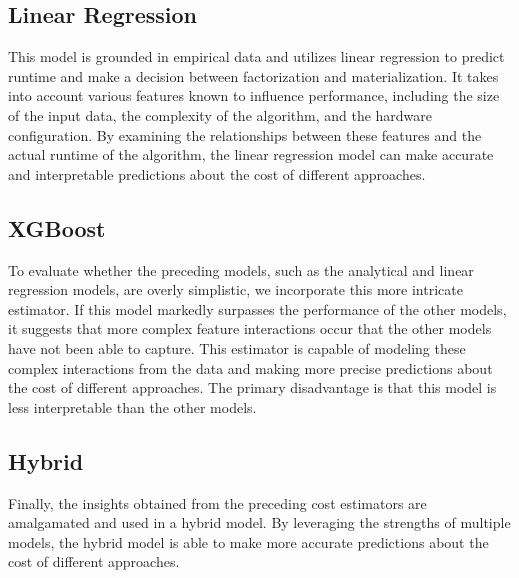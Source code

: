 \subsection{Linear Regression}
This model is grounded in empirical data and utilizes linear regression to predict runtime and make a decision between factorization and materialization. It takes into account various features known to influence performance, including the size of the input data, the complexity of the algorithm, and the hardware configuration. By examining the relationships between these features and the actual runtime of the algorithm, the linear regression model can make accurate and interpretable predictions about the cost of different approaches.

\subsection{XGBoost}
To evaluate whether the preceding models, such as the analytical and linear regression models, are overly simplistic, we incorporate this more intricate estimator. If this model markedly surpasses the performance of the other models, it suggests that more complex feature interactions occur that the other models have not been able to capture. This estimator is capable of modeling these complex interactions from the data and making more precise predictions about the cost of different approaches. The primary disadvantage is that this model is less interpretable than the other models.

\subsection{Hybrid}
Finally, the insights obtained from the preceding cost estimators are amalgamated and used in a hybrid model. By leveraging the strengths of multiple models, the hybrid model is able to make more accurate predictions about the cost of different approaches.